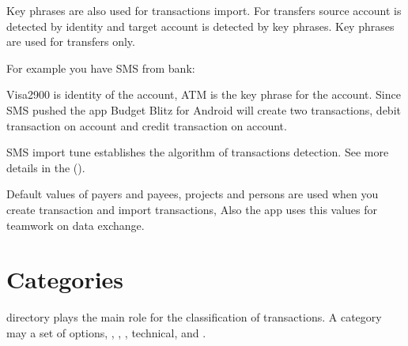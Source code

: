 \documentclass[a4paper,10pt,english]{sphinxmanual}
\begin{document}
\sphinxAtStartPar
Key phrases are also used for transactions import. For transfers source account is detected by identity
and target account is detected by key phrases. Key phrases are used for transfers only.

\sphinxAtStartPar
For example you have SMS from bank:

\begin{sphinxVerbatim}[commandchars=\\\{\}]
           
\end{sphinxVerbatim}

\sphinxAtStartPar
Visa2900 is identity of the  account, ATM is the key phrase for the  account.
Since SMS pushed the app Budget Blitz for Android will create two transactions, debit transaction on  account
and credit transaction on  account.

\sphinxAtStartPar
SMS import tune establishes the algorithm of transactions detection. See more details in the {\hyperref[\detokenize{notifications:chapter-notifications}]{}} ().

\sphinxAtStartPar
Default values of payers and payees, projects and persons are used when you create transaction
and import transactions, Also the app uses this values for teamwork on data exchange.

\noindent{}
\noindent{}
\noindent{}


\section{Categories}
\label{\detokenize{directories:categories}}
\sphinxAtStartPar
{} directory plays the main role for the classification of transactions.
A category may a set of options,
, , ,
technical,  and  .
\end{document}
